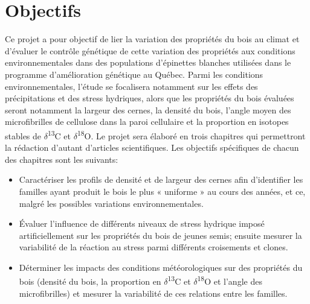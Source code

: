 \documentclass{report}
\newcommand{\Ctreize}{$\delta$\textsuperscript{13}C\xspace}
\newcommand{\Odixhuit}{$\delta$\textsuperscript{18}O\xspace}
\begin{document}
\section*{Objectifs}

Ce projet a pour objectif de lier la variation des propriétés du bois au climat et d'évaluer le contrôle génétique de cette variation des propriétés aux conditions environnementales dans des populations d'épinettes blanches utilisées dans le programme d'amélioration génétique au Québec. Parmi les conditions environnementales, l'étude se focalisera notamment sur les effets des précipitations et des stress hydriques, alors que les propriétés du bois évaluées seront notamment la largeur des cernes, la densité du bois, l'angle moyen des microfibrilles de cellulose dans la paroi cellulaire et la proportion en isotopes stables de \Ctreize et \Odixhuit. Le projet sera élaboré en trois chapitres qui permettront la rédaction d'autant d'articles scientifiques. Les objectifs spécifiques de chacun des chapitres sont les suivants:\\

\begin{itemize} 
	
	\item Caractériser les profils de densité et de largeur des cernes afin d'identifier les familles ayant produit le bois le plus « uniforme » au cours des années, et ce, malgré les possibles variations environnementales. 
	
	\item Évaluer l'influence de différents niveaux de stress hydrique imposé artificiellement sur les propriétés du bois de jeunes semis; ensuite mesurer la variabilité de la réaction au stress parmi différents croisements et clones. 	
	
	\item Déterminer les impacts des conditions météorologiques sur des propriétés du bois (densité du bois, la proportion en \Ctreize et \Odixhuit et l'angle des microfibrilles) et mesurer la variabilité de ces relations entre les familles.
	
	
\end{itemize}
\end{document}
